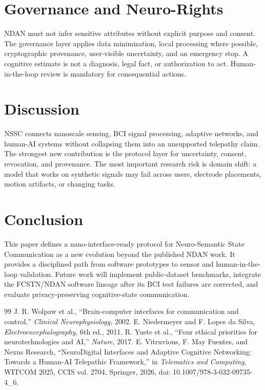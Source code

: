 \documentclass[sigconf]{acmart}
\begin{document}
\section{Governance and Neuro-Rights}
NDAN must not infer sensitive attributes without explicit purpose and consent. The governance layer applies data minimization, local processing where possible, cryptographic provenance, user-visible uncertainty, and an emergency stop. A cognitive estimate is not a diagnosis, legal fact, or authorization to act. Human-in-the-loop review is mandatory for consequential actions.

\section{Discussion}
NSSC connects nanoscale sensing, BCI signal processing, adaptive networks, and human-AI systems without collapsing them into an unsupported telepathy claim. The strongest new contribution is the protocol layer for uncertainty, consent, revocation, and provenance. The most important research risk is domain shift: a model that works on synthetic signals may fail across users, electrode placements, motion artifacts, or changing tasks.

\section{Conclusion}
This paper defines a nano-interface-ready protocol for Neuro-Semantic State Communication as a new evolution beyond the published NDAN work. It provides a disciplined path from software prototypes to sensor and human-in-the-loop validation. Future work will implement public-dataset benchmarks, integrate the FCSTN/NDAN software lineage after its BCI test failures are corrected, and evaluate privacy-preserving cognitive-state communication.

\begin{thebibliography}{99}
 J. R. Wolpaw et al., ``Brain-computer interfaces for communication and control,'' \emph{Clinical Neurophysiology}, 2002.
 E. Niedermeyer and F. Lopes da Silva, \emph{Electroencephalography}, 6th ed., 2011.
 R. Yuste et al., ``Four ethical priorities for neurotechnologies and AI,'' \emph{Nature}, 2017.
 E. Vitruvious, F. May Fuentes, and Nexus Research, ``NeuroDigital Interfaces and Adaptive Cognitive Networking: Towards a Human-AI Telepathic Framework,'' in \emph{Telematics and Computing}, WITCOM 2025, CCIS vol. 2704, Springer, 2026, doi: 10.1007/978-3-032-09735-4\_6.
\end{thebibliography}
\end{document}
